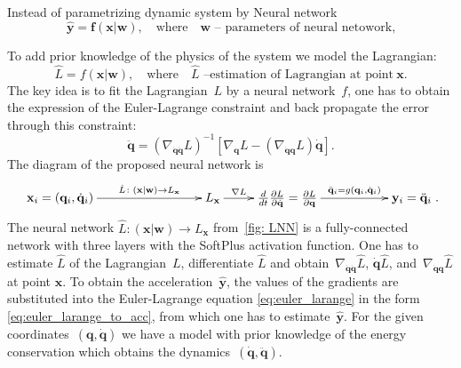 \documentclass[sn-mathphys-num]{sn-jnl}
\theoremstyle{thmstylethree}
\theoremstyle{thmstyletwo}
\theoremstyle{thmstyleone}
\begin{document}
Instead of parametrizing dynamic system by Neural network
\begin{equation}
\hat{\mathbf{y}}  = \mathbf{f}(\mathbf{x} | \mathbf{w}),
\quad
\text{where}
\quad
\mathbf{w} \text{~-- parameters of neural netowork,}
\label{eq:model}
\end{equation}

To add prior knowledge of the physics of the system we model the Lagrangian:
\begin{equation}
\hat{L}  = f(\mathbf{x} | \mathbf{w}),
\quad
\text{where}
\quad
\hat{L}\text{~--estimation of Lagrangian at point}~\mathbf{x}.
\end{equation}
The key idea is to fit the Lagrangian~$L$ by a neural network~$f$, one has to obtain the expression of the Euler-Lagrange constraint and back propagate the error through this constraint:
\begin{equation}
\ddot{\mathbf{q}} =\left(\nabla_{\dot{\mathbf{q}} \dot{\mathbf{q}}} L\right)^{-1}\left[\nabla_{\mathbf{q}} L-\left(\nabla_{\dot{\mathbf{q}}\mathbf{q}} L\right) \dot{\mathbf{q}}\right].
\label{eq:euler_larange_to_acc}
\end{equation}
The diagram of the proposed neural network is
\begin{equation}
    \xymatrix{
    \mathbf{x}_i = (\mathbf{q}_i, \dot{\mathbf{q}}_i) \ar@{->}[rrr]^-{\hat{L} \colon (\mathbf{x} | \mathbf{w}) \to L_\mathbf{x}} & & & L_\mathbf{x} \ar@{->}[r]^-{\nabla L} & \frac{d}{d t} \frac{\partial L}{\partial \dot{\mathbf{q}}} =\frac{\partial L}{\partial \mathbf{q}} \ar@{->}[rr]^-{{\ddot{\mathbf{q}}_i = g\left(\mathbf{q}_i, \dot{\mathbf{q}}_i\right)}} &  & \mathbf{y}_i = \ddot{\mathbf{q}}_i
    }.
\label{fig: LNN}
\end{equation}
The neural network $\hat{L} \colon (\mathbf{x} | \mathbf{w}) \to L_\mathbf{x}$ from~\eqref{fig: LNN} is a fully-connected network with three layers with the SoftPlus activation function.  One has to estimate $\hat{L}$ of the Lagrangian~$L$, differentiate $\hat{L}$ and obtain~$\nabla_{\dot{\mathbf{q}}\dot{\mathbf{q}}}\hat{L}$, $\dot{\mathbf{q}}\hat{L}$, and~$\nabla_{\dot{\mathbf{q}}\mathbf{q}} \hat{L}$ at point $\mathbf{x}$. To obtain the acceleration~$\hat{\mathbf{y}}$, the values of the gradients are substituted into the Euler-Lagrange equation \eqref{eq:euler_larange} in the form \eqref{eq:euler_larange_to_acc}, from which one has to estimate~$\hat{\mathbf{y}}$. For the given coordinates~$(\mathbf{q}, \dot{\mathbf{q}})$ we have a model with prior knowledge of the energy conservation which obtains the dynamics~$(\dot{\mathbf{q}}, \ddot{\mathbf{q}})$. 
\end{document}
